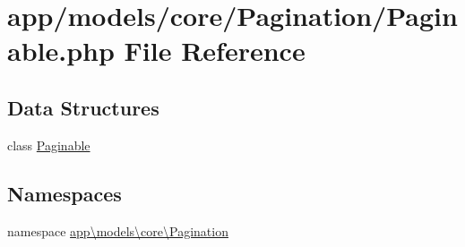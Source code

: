 \hypertarget{_paginable_8php}{\section{app/models/core/\-Pagination/\-Paginable.php File Reference}
\label{_paginable_8php}
}
\subsection*{Data Structures}
\begin{DoxyCompactItemize}
\item 
class \hyperlink{classapp_1_1models_1_1core_1_1_pagination_1_1_paginable}{Paginable}
\end{DoxyCompactItemize}
\subsection*{Namespaces}
\begin{DoxyCompactItemize}
\item 
namespace \hyperlink{namespaceapp_1_1models_1_1core_1_1_pagination}{app\textbackslash{}models\textbackslash{}core\textbackslash{}\-Pagination}
\end{DoxyCompactItemize}
